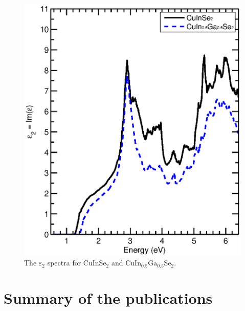 \documentclass[a4paper, 12pt, titlepage,oneside,drop]{kthesis}
\begin{document}
\begin{figure}[H]
\begin{center}
\includegraphics[scale=0.7]{thesis2.eps}
\end{center}
\caption{The $\varepsilon_2$ spectra for ${\mathrm{ CuInSe_2}}$ and $\mathrm {CuIn_{0.5}Ga_{0.5}Se_2}$. }
\label{ccccc}
\end{figure}


\chapter{Summary of the publications}
\end{document}
